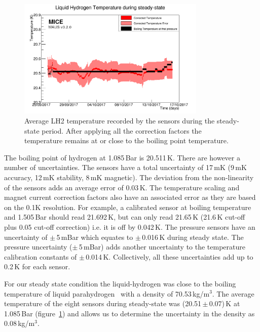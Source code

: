 \begin{figure}[htb!]
  \begin{center}
  \includegraphics[width=0.80\textwidth]{11-Absorber/Figures/SteadyState60mK_logo.png}
  \end{center}
  \caption{Average LH2 temperature recorded by the sensors during the steady-state period. After applying all the correction factors the temperature remains at or close to the boiling point temperature.}
  \label{Fig:TempCalibrated}
\end{figure}
 
The boiling point of hydrogen at 1.085\,Bar is 20.511\,K. There are however a number of uncertainties.
The sensors have a total uncertainty of 17\,mK (9\,mK accuracy, 12\,mK stability, 8\,mK magnetic). The deviation from the non-linearity of the sensors adds an average error of 0.03\,K.
The temperature scaling and magnet current correction factors also have an associated error as they are based on the 0.1K resolution.
For example, a calibrated sensor at boiling temperature and 1.505\,Bar should read 21.692\,K, but can only read 21.65\,K (21.6\,K cut-off plus 0.05 cut-off correction) i.e. it is off by 0.042\,K. The pressure sensors have an uncertainty of $\mathrm{\pm}$\,5\,mBar which equates to $\mathrm{\pm}$\,0.016\,K during steady state.
The pressure uncertainty ($\mathrm{\pm}$\,5\,mBar) adds another uncertainty to the temperature calibration constants of $\mathrm{\pm}$\,0.014\,K. Collectively, all these uncertainties add up to 0.2\,K for each sensor.
 
For our steady state condition the liquid-hydrogen was close to the boiling temperature of liquid parahydrogen~\cite{NOTE524} with a density of 70.53\,kg/m$^{3}$. The average temperature of the eight sensors during steady-state was (20.51\,$\mathrm{\pm}$\,0.07)\,K at 1.085\,Bar (figure~\ref{Fig:TempCalibrated}) and allows us to determine the uncertainty in the density as 0.08\,kg/m$^{3}$.
 

